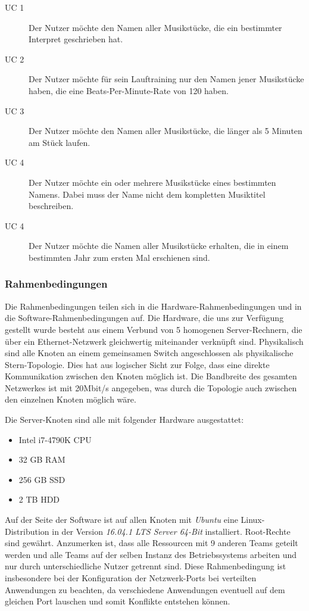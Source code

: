 \begin{description}
	\item[UC 1] Der Nutzer möchte den Namen aller Musikstücke, die ein bestimmter Interpret geschrieben hat.
	\item[UC 2] Der Nutzer möchte für sein Lauftraining nur den Namen jener Musikstücke haben, die eine Beats-Per-Minute-Rate
		von 120 haben.
	\item[UC 3] Der Nutzer möchte den Namen aller Musikstücke, die länger als 5 Minuten am Stück laufen.
	\item[UC 4] Der Nutzer möchte ein oder mehrere Musikstücke eines bestimmten Namens. Dabei muss der Name nicht dem 
		kompletten Musiktitel beschreiben.
	\item[UC 4] Der Nutzer möchte die Namen aller Musikstücke erhalten, die in einem bestimmten Jahr zum ersten Mal erschienen sind.
\end{description}

\subsubsection{Rahmenbedingungen}
\label{anforderungen:rahmenbedingungen}
Die Rahmenbedingungen teilen sich in die Hardware-Rahmenbedingungen und in die Software-Rahmenbedingungen auf.
Die Hardware, die uns zur Verfügung gestellt wurde besteht aus einem Verbund von 5 homogenen Server-Rechnern, 
die über ein Ethernet-Netzwerk gleichwertig miteinander verknüpft sind. Physikalisch sind alle Knoten an einem gemeinsamen
Switch angeschlossen als physikalische Stern-Topologie. Dies hat aus logischer Sicht zur Folge, dass eine direkte Kommunikation
zwischen den Knoten möglich ist. Die Bandbreite des gesamten Netzwerkes ist mit 20Mbit/s angegeben, was durch die Topologie
auch zwischen den einzelnen Knoten möglich wäre.

Die Server-Knoten sind alle mit folgender Hardware ausgestattet:
\begin{itemize}
	\item Intel i7-4790K CPU
	\item 32 GB RAM
	\item 256 GB SSD
	\item 2 TB HDD
\end{itemize}

Auf der Seite der Software ist auf allen Knoten mit \textit{Ubuntu} eine Linux-Distribution in der Version 
\textit{16.04.1 LTS Server 64-Bit} installiert. Root-Rechte sind gewährt.
Anzumerken ist, dass alle Ressourcen mit 9 anderen Teams geteilt werden und alle Teams auf der selben 
Instanz des Betriebssystems arbeiten und nur durch unterschiedliche Nutzer getrennt sind. 
Diese Rahmenbedingung ist insbesondere bei der Konfiguration der Netzwerk-Ports bei verteilten Anwendungen 
zu beachten, da verschiedene Anwendungen eventuell auf dem gleichen Port lauschen und somit 
Konflikte entstehen können.

